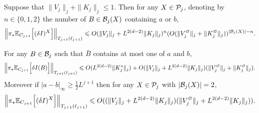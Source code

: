 \documentclass[11pt]{amsart}
\numberwithin{equation}{section}
\numberwithin{theorem}{section}
\newcommand{\1}{{\bf 1}}
\newcommand{\obs}{\star}
\newcommand{\Vbulk}{V^\varnothing}
\newcommand{\Kbulk}{K^\varnothing}
\newcommand{\Kobs}{K^\obs}
\begin{document}
\begin{lemma}
\label{lem:smallset-Vobs1}
Suppose that 
$\|V_j\|_j+\|K_{j}\|_j\leq 1$.
  Then for any $X \in \mathcal P_j$, denoting by $n\in\{0,1,2\}$ the number of $B\in \mathcal B_j(X)$ containing $a$ or $b$,
  \begin{equation} \label{e:smallset-Vobs-1}
    \normB{\pi_\obs \E_{C_{j+1}}\qB{(\delta I)^X}}_{T_{j+1}(\ell_{j+1})} \leq
    O
    (\|V_j\|_j+ L^{2(d-2)}\|K_j\|_j)^n
    (O(\|\Vbulk_j\|_j+\|\Kbulk_j\|_j))^{|\cB_j(X)|-n}
    .
  \end{equation}
  
  For any $B\in \mathcal B_j$ such that $\bar B$ contains at most one of $a$ and $b$,
  \begin{equation}
    \label{E:Blockobs}
    \normB{\pi_\obs \E_{C_{j+1}}\qB{\delta I(B)}}_{T_{j+1}(\ell_{j+1})} \leq
    O(L^{2(d-2)}\|\Kobs_j\|_j)+O(\|V_j\|_j+L^{2(d-2)}\|K_j\|_j)(\|\Vbulk_j\|_j+\|\Kbulk_j\|_j).
  \end{equation}
  Moreover if $|a-b|_\infty \geq \frac12 L^{j+1}$ then for any $X\in\mathcal P_j$ with $|\mathcal B_j(X)|=2$, 
  \begin{equation} \label{e:deltaI-obs-4}
    \normB{\pi_\obs \E_{C_{j+1}}\qB{(\delta I)^X}}_{T_{j+1}(\ell_{j+1})}
    \leq O((\|V_j\|_j + L^{2(d-2)}\|K_j\|_j)(\|\Vbulk_j\|_j + L^{2(d-2)}\|K_j\|_j)).
  \end{equation}
\end{lemma}
\end{document}
